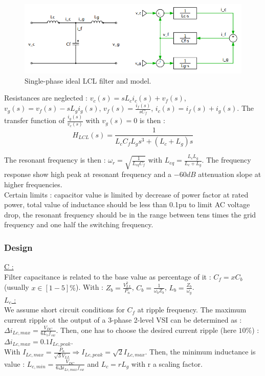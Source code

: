 \documentclass[../main.tex]{subfiles}
\begin{document}
\begin{figure}[hbt!]
    \centering
    \includegraphics[width=0.5\linewidth]{IMAGES/Indus_el/Screenshot from 2024-11-25 08-28-33.png}
    \caption{Single-phase ideal LCL filter and model.}
\end{figure}

Resistances are neglected : $v_c(s) = sL_c i_c(s) + v_f(s)$, $v_g(s) = v_f(s) - sL_g i_g(s)$, $v_f(s) = \frac{i_f(s)}{sC_f}$, $i_c(s) = i_f(s) + i_g(s)$. The transfer function of $\frac{i_g(s)}{v_c(s)}$ with $v_g(s) = 0$ is then : \begin{equation}
    H_{LCL}(s) = \frac{1}{L_c C_f L_g s^3 + (L_c + L_g)s}
\end{equation}

The resonant frequency is then : $\omega_r = \sqrt{\frac{1}{L_{eq} C_f}}$ with $L_{eq} = \frac{L_cL_g}{L_c+L_g}$. The frequency response show high peak at resonant frequency and a $-60 dB$ attenuation slope at higher frequencies.\\
Certain limits : capacitor value is limited by decrease of power factor at rated power, total value of inductance should be less than 0.1pu to limit AC voltage drop, the resonant frequency should be in the range between tens times the grid frequency and one half the switching frequency. \\

\subsubsection{Design}
\quad \underline{C :}\\
Filter capacitance is related to the base value as percentage of it : $C_f = x C_b$ (usually $x \in [1-5]\%$). With : $Z_b = \frac{V_{LL}^2}{P_n}$, $C_b = \frac{1}{\omega_b Z_b}$, $L_b = \frac{Z_b}{\omega_g}$.\\

\quad \underline{$L_c$ :}\\
We assume short circuit conditions for $C_f$ at ripple frequency. The maximum current ripple ot the output of a 3-phase 2-level VSI can be determined as : $\Delta i_{Lc, max} = \frac{V_{DC}}{6L_c f_{sw}}$. Then, one has to choose the desired current ripple (here $10\%$) : $\Delta i_{Lc,max} = 0.1 I_{Lc,peak}$.\\
With $I_{Lc,max} = \frac{P_n}{\sqrt{3} V_{LL}} \Rightarrow I_{Lc,peak} = \sqrt{2} I_{Lc,max}$. Then, the minimum inductance is value : $L_{c,min} = \frac{V_{DC}}{6 \Delta i_{Lc,max} f_{sw}}$ and $L_c = rL_g$ with r a scaling factor.\\
\end{document}
